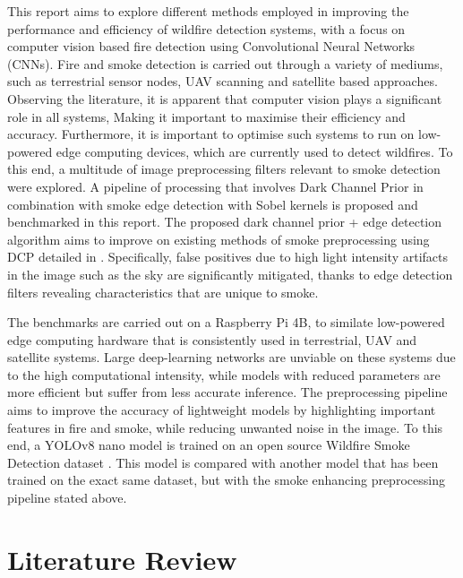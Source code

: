 \documentclass[lettersize,journal]{IEEEtran}
\begin{document}
This report aims to explore different methods employed in improving the
performance and efficiency of wildfire detection systems, with a focus
on computer vision based fire detection using Convolutional Neural
Networks (CNNs). Fire and smoke detection is carried out through a variety of
mediums, such as terrestrial sensor nodes, UAV scanning and satellite
based approaches. Observing the literature, it is apparent that computer
vision plays a significant role in all systems, Making it important to
maximise their efficiency and accuracy. Furthermore, it is important to
optimise such systems to run on low-powered edge computing devices,
which are currently used to detect wildfires. To this end, a multitude
of image preprocessing filters relevant to smoke detection were explored. 
A pipeline of processing that involves Dark Channel Prior in combination with smoke edge detection with Sobel kernels is proposed and benchmarked in this report. 
The proposed dark channel prior + edge detection algorithm
aims to improve on existing methods of smoke preprocessing using DCP
detailed in \cite{prepfire}. Specifically, false positives due to high
light intensity artifacts in the image such as the sky are significantly
mitigated, thanks to edge detection filters revealing characteristics
that are unique to smoke.

The benchmarks are carried out on a Raspberry Pi 4B, to
similate low-powered edge computing hardware that is consistently used
in terrestrial, UAV and satellite systems. Large deep-learning networks
are unviable on these systems due to the high computational intensity,
while models with reduced parameters are more efficient but suffer from
less accurate inference. The preprocessing pipeline aims to improve the
accuracy of lightweight models by highlighting important features in
fire and smoke, while reducing unwanted noise in the image.
To this end, a YOLOv8 nano model is trained on an open source Wildfire Smoke Detection dataset \cite{yolov8}.
This model is compared with another model that has been trained on the exact same dataset, but with the smoke enhancing preprocessing pipeline stated above.


\section{Literature Review}
\end{document}
